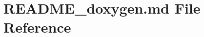 \hypertarget{README__doxygen_8md}{}\section{R\+E\+A\+D\+M\+E\+\_\+doxygen.\+md File Reference}
\label{README__doxygen_8md}
